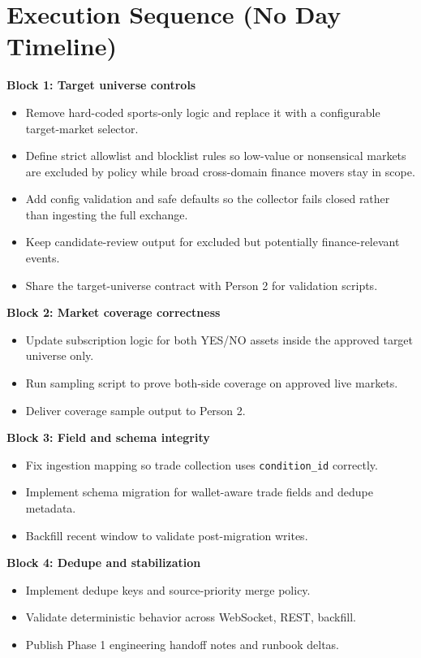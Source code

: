 \documentclass{article}
\begin{document}
\section*{Execution Sequence (No Day Timeline)}
\textbf{Block 1: Target universe controls}
\begin{itemize}
\item Remove hard-coded sports-only logic and replace it with a configurable target-market selector.
\item Define strict allowlist and blocklist rules so low-value or nonsensical markets are excluded by policy while broad cross-domain finance movers stay in scope.
\item Add config validation and safe defaults so the collector fails closed rather than ingesting the full exchange.
\item Keep candidate-review output for excluded but potentially finance-relevant events.
\item Share the target-universe contract with Person 2 for validation scripts.
\end{itemize}

\textbf{Block 2: Market coverage correctness}
\begin{itemize}
\item Update subscription logic for both YES/NO assets inside the approved target universe only.
\item Run sampling script to prove both-side coverage on approved live markets.
\item Deliver coverage sample output to Person 2.
\end{itemize}

\textbf{Block 3: Field and schema integrity}
\begin{itemize}
\item Fix ingestion mapping so trade collection uses \texttt{condition\_id} correctly.
\item Implement schema migration for wallet-aware trade fields and dedupe metadata.
\item Backfill recent window to validate post-migration writes.
\end{itemize}

\textbf{Block 4: Dedupe and stabilization}
\begin{itemize}
\item Implement dedupe keys and source-priority merge policy.
\item Validate deterministic behavior across WebSocket, REST, backfill.
\item Publish Phase 1 engineering handoff notes and runbook deltas.
\end{itemize}
\end{document}
